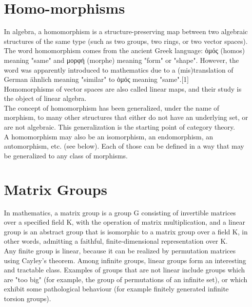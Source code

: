 \section{Homo-morphisms}

In algebra, a homomorphism is a structure-preserving map between two algebraic structures of the same type (such as two groups, two rings, or two vector spaces). The word homomorphism comes from the ancient Greek language: ὁμός (homos) meaning "same" and μορφή (morphe) meaning "form" or "shape". However, the word was apparently introduced to mathematics due to a (mis)translation of German ähnlich meaning "similar" to ὁμός meaning "same".[1] \\

Homomorphisms of vector spaces are also called linear maps, and their study is the object of linear algebra.\\

The concept of homomorphism has been generalized, under the name of morphism, to many other structures that either do not have an underlying set, or are not algebraic. This generalization is the starting point of category theory. \\

A homomorphism may also be an isomorphism, an endomorphism, an automorphism, etc. (see below). Each of those can be defined in a way that may be generalized to any class of morphisms. \\


\section{Matrix Groups}

In mathematics, a matrix group is a group G consisting of invertible matrices over a specified field K, with the operation of matrix multiplication, and a linear group is an abstract group that is isomorphic to a matrix group over a field K, in other words, admitting a faithful, finite-dimensional representation over K.\\

Any finite group is linear, because it can be realized by permutation matrices using Cayley's theorem. Among infinite groups, linear groups form an interesting and tractable class. Examples of groups that are not linear include groups which are "too big" (for example, the group of permutations of an infinite set), or which exhibit some pathological behaviour (for example finitely generated infinite torsion groups). \\

